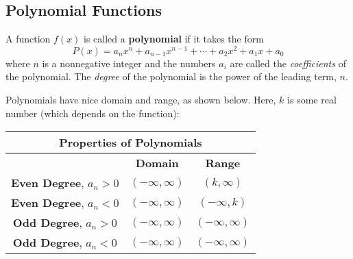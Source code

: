 \documentclass[notes]{subfiles}
\begin{document}
	\subsection*{Polynomial Functions}
		\begin{defn}
			A function \(f(x)\) is called a \textbf{polynomial} if it takes the form
				\[P(x) = a_nx^n + a_{n-1}x^{n-1} + \cdots + a_2x^2 + a_1x + a_0\]
			where \(n\) is a nonnegative integer and the numbers \(a_i\) are called the \emph{coefficients} of the polynomial. The \emph{degree} of the polynomial is the power of the leading term, \(n\).
		\end{defn}
		
		Polynomials have nice domain and range, as shown below. Here, \(k\) is some real number (which depends on the function):
	 	\begin{center}
	 		\setlength{\arrayrulewidth}{1.5pt}
	 		\renewcommand{\arraystretch}{1.5}
	 		\begin{tabular}{|c|c|c|}\hline
	 			\multicolumn{3}{|c|}{{\large \textbf{Properties of Polynomials}}} \\ \hline
	 			
	 			& \textbf{Domain} & \textbf{Range} \\ \hline
	 			\textbf{Even Degree}, \(a_n > 0\) & \((-\infty,\infty)\) & \((k, \infty)\) \\ \hline
	 			\textbf{Even Degree}, \(a_n < 0\) & \((-\infty,\infty)\) & \((-\infty,k)\) \\ \hline
	 			\textbf{Odd Degree}, \(a_n > 0\) & \((-\infty,\infty)\) & \((-\infty,\infty)\) \\ \hline
	 			\textbf{Odd Degree}, \(a_n < 0\) & \((-\infty,\infty)\) & \((-\infty,\infty)\) \\ \hline
	 		\end{tabular}
	 	\end{center}
	 		\newpage
		
\end{document}
